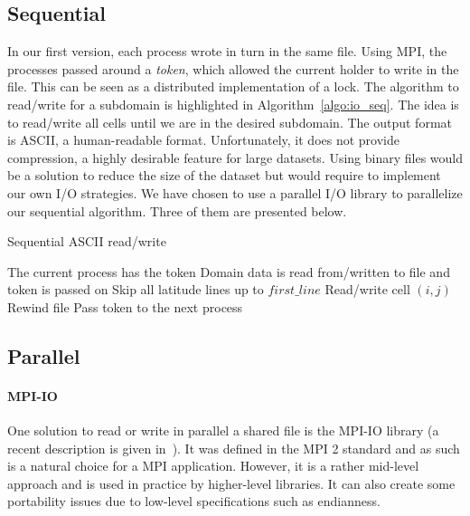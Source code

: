 \subsection{Sequential}
In our first version, each process wrote in turn in the same file. Using MPI,
the processes passed around a \textit{token}, which allowed the current holder
to write in the file. This can be seen as a distributed implementation of a lock.
The algorithm to read/write for a subdomain is highlighted in
Algorithm~\ref{algo:io_seq}. The idea is to read/write all cells until we
are in the desired subdomain.
The output format is ASCII, a human-readable format. Unfortunately, it does not
provide compression, a highly desirable feature for large datasets. Using binary files would
be a solution to reduce the size of the dataset but would require to implement
our own I/O strategies. We have chosen to use a parallel I/O library to
parallelize our sequential algorithm. Three of them are presented below.

\begin{algorithm}
  \caption{Sequential ASCII read/write}
  \label{algo:io_seq}
  \begin{algorithmic}
    \Require The current process has the token
    \Ensure Domain data is read from/written to file and token is passed on
    \State Skip all latitude lines up to $first\_line$
          \State Read/write cell $(i,j)$
        \EndIf
      \EndFor
    \EndFor
    \State Rewind file
    \State Pass token to the next process
  \end{algorithmic}
\end{algorithm}

\subsection{Parallel}
\paragraph{MPI-IO}
One solution to read or write in parallel a shared file is the MPI-IO
library (a recent description is given in~\cite{Liao2014}). It was defined in
the MPI 2 standard and as such is a natural choice for a MPI application.
However, it is a rather mid-level approach and is used in practice by
higher-level libraries. It can also create some portability issues due to
low-level specifications such as \gls{endianness}.

